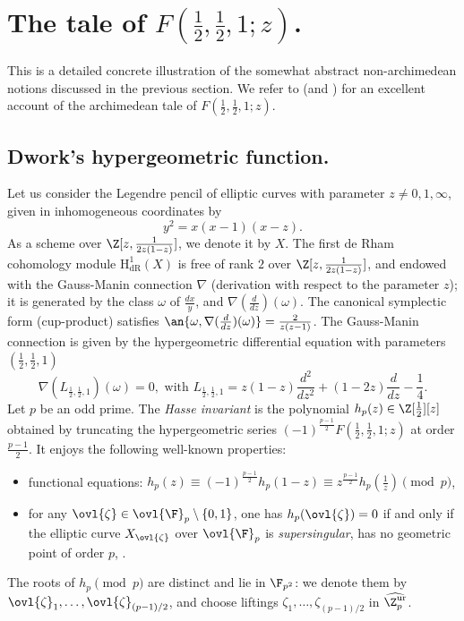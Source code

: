 \newpage
\section{The tale of $F(\frac{1}{2},\frac{1}{2},1;z)$.}\label{sec-tale}

\begin{abst}
This is a detailed concrete illustration of the somewhat abstract
non-archimedean notions discussed in the previous section. We refer to
\cite{hfml} (and \cite[9]{husemoeller87:_ellip}) for an excellent account of
the archimedean tale of $F(\frac{1}{2},\frac{1}{2},1;z)$.
\end{abst}

\subsection{Dwork's hypergeometric function.}\label{sub-dwork-hyper}

Let us consider the Legendre pencil of elliptic
curves with parameter $z\neq 0,1,\infty$, given in inhomogeneous coordinates by
\begin{equation*}
 y^2=x(x-1)(x-z).
\end{equation*}
As a scheme over ${\Z}[z,\frac{1}{{2z(1-z)}}]$, we denote it by $X$. The
first de Rham cohomology module $\mathrm{H}^1_{\mathrm{dR}}(X)$ is free
of rank $2$ over ${\Z}[z,\frac{1}{{2z(1-z)}}]$, and endowed with the
Gauss-Manin connection $\nabla$ (derivation with respect to the
parameter $z$); it is generated by the class $\omega$ of $\frac{dx}{y}$,
and $\nabla(\frac{d}{dz})(\omega)$. The canonical symplectic form
(cup-product) satisfies
$\an{\omega, \nabla(\frac{d}{dz})(\omega)}=\frac{2}{z(z-1)}$. The
Gauss-Manin connection is given by the hypergeometric differential
equation with parameters $(\frac{1}{2},\frac{1}{2},1)$
\begin{equation*}
\nabla(L_{\frac{1}{2},\frac{1}{2},1})(\omega)=0,\text{ with }
L_{\frac{1}{2},\frac{1}{2},1} =
z(1-z)\frac{d^2}{dz^2}+(1-2z)\frac{d}{dz}-\frac{1}{4}.
\end{equation*}
Let $p$ be an odd prime. The {\it Hasse invariant} is the polynomial
$h_p(z) \in {\Z}[\frac{1}{2}][z]$ obtained by truncating the
hypergeometric series $(-1)^\frac{p-1}{2}F(\frac{1}{2},\frac{1}{2},1;z)$
at order $\frac{p-1}{2}$. It enjoys the following well-known properties:
\begin{itemize}
 \item functional equations: $h_p(z)\equiv
       (-1)^\frac{p-1}{2}h_p(1-z)\equiv
       z^\frac{p-1}{2}h_p(\frac{1}{z})\pmod{p}$,
 \item for any $\ovl{\zeta} \in \ovl{\F}_p \setminus \lbrace0,1\rbrace$,
       one has $h_p(\ovl{\zeta})=0$ if and only if the elliptic
       curve $X_{\ovl{\zeta}}$ over $\ovl{\F}_p$ is {\it supersingular}, \ie
       has no geometric point of order $p$,
       \cf \cite[13.3]{husemoeller87:_ellip}.
\end{itemize}
The roots of $h_p \pmod{p}$ are distinct and lie in ${\F}_{p^2}$: we
denote them by $\ovl{\zeta}_1,\ldots,\ovl{\zeta}_{(p-1)/2}$, and choose
liftings ${\zeta}_1,\ldots,{\zeta}_{(p-1)/2}$ in
$\widehat{{\Z}_p^{\mathrm{ur}}}$.


